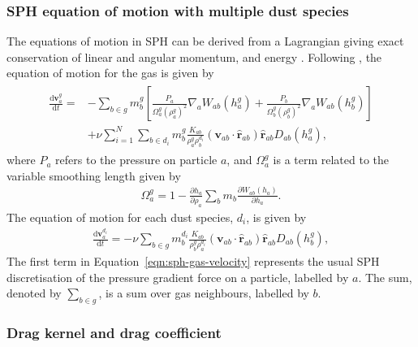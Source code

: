 \documentclass[fleqn,usenatbib]{mnras}
\newcommand{\dd}{\mathrm{d}}
\let\vec\mathbf
\begin{document}
\subsubsection{SPH equation of motion with multiple dust species}

The equations of motion in SPH can be derived from a Lagrangian giving exact
conservation of linear and angular momentum, and energy
\citep{Price2012JCoPh.231..759P}. Following \citet{Laibe2012MNRAS.420.2345L},
the equation of motion for the gas is given by
%
\begin{align}
   \label{eqn:sph-gas-velocity}
   \begin{split}
      \frac{\dd \vec{v}^g_a}{\dd t} = &- \sum_{b \in g} m^g_b \left[
         \frac{P_a}{\Omega^g_a {\left(\rho^g_a\right)}^2} \nabla_a W_{ab}(h^g_a) +
         \frac{P_b}{\Omega^g_b {\left(\rho^g_b\right)}^2} \nabla_a W_{ab}(h^g_b)
      \right] \\
      &+ \nu \sum_{i=1}^N \sum_{b \in d_i} m^g_b \frac{K_{ab}}{\rho^g_a \rho^{d_i}_b}
         (\vec{v}_{ab} \cdot \hat{\vec{r}}_{ab}) \hat{\vec{r}}_{ab} D_{ab}(h^g_a),
   \end{split}
\end{align}
%
where \(P_a\) refers to the pressure on particle \(a\), and \(\Omega^g_a\) is a
term related to the variable smoothing length given by
%
\begin{align}
   \Omega^g_a = 1 - \frac{\partial h_a}{\partial \rho_a}
      \sum_b m_b \frac{\partial W_{ab}(h_a)}{\partial h_a}.
\end{align}
%
The equation of motion for each dust species, \(d_i\), is given by
%
\begin{align}
   \label{eqn:sph-dust-velocity}
   \frac{\dd \vec{v}^{d_i}_a}{\dd t} =
      - \nu \sum_{b \in g} m^{d_i}_b \frac{K_{ab}}{\rho^g_b \rho^{d_i}_a}
      (\vec{v}_{ab} \cdot \hat{\vec{r}}_{ab}) \hat{\vec{r}}_{ab} D_{ab}(h^g_b),
\end{align}
%
The first term in Equation~\ref{eqn:sph-gas-velocity} represents the usual SPH
discretisation of the pressure gradient force on a particle, labelled by \(a\).
The sum, denoted by \(\sum_{b \in g}\), is a sum over gas neighbours, labelled
by \(b\).

\subsubsection{Drag kernel and drag coefficient}
\end{document}
